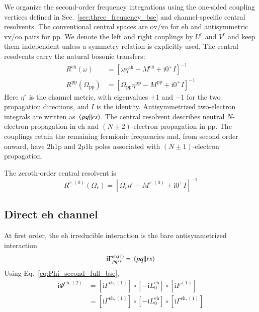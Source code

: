 \documentclass[aip,jcp,reprint,noshowkeys,superscriptaddress]{revtex4-1}
\newcommand{\ii}{\mathrm{i}}
\newcommand{\hhp}{\text{2h1p}}
\newcommand{\pph}{\text{2p1h}}
\newcommand{\eh}{\text{eh}}
\newcommand{\pp}{\text{pp}}
\begin{document}
We organize the second-order frequency integrations using the one-sided
coupling vertices defined in Sec.~\ref{sec:three_frequency_bse} and
channel-specific central resolvents.
The conventional central spaces are $\text{ov}/\text{vo}$ for $\eh$
and antisymmetric $\text{vv}/\text{oo}$ pairs for $\pp$.
We denote the left and right couplings by $U^r$ and $V^r$ and keep them
independent unless a symmetry relation is explicitly used.
The central resolvents carry the natural bosonic transfers:
\begin{align}
    R^\eh(\omega)&=[\omega\eta^\eh-M^\eh+\ii0^+I]^{-1}
    \label{eq:target_R_eh}
    \\
    R^\pp(\Omega_\pp)&=[\Omega_\pp\eta^\pp-M^\pp+\ii0^+I]^{-1}
    \label{eq:target_R_pp}
\end{align}
Here $\eta^r$ is the channel metric, with eigenvalues $+1$ and $-1$
for the two propagation directions, and $I$ is the identity.
Antisymmetrized two-electron integrals are written as $\mel{pq}{}{rs}$.
The central resolvent describes neutral $N$-electron propagation in
$\eh$ and $(N\pm2)$-electron propagation in $\pp$.
The couplings retain the remaining fermionic frequencies and, from
second order onward, have $\hhp$ and $\pph$ poles associated with
$(N\pm1)$-electron propagation.


The zeroth-order central resolvent is
\begin{equation}
    R^{r,(0)}(\Omega_r)
    =[\Omega_r\eta^r-M^{r,(0)}+\ii0^+I]^{-1}
    \label{eq:target_R_zero}
\end{equation}

\subsection{Direct eh channel}

At first order, the $\eh$ irreducible interaction is the bare
antisymmetrized interaction
\begin{equation}
	\ii\Gamma^{\eh,(1)}_{pqrs}
	=
	\mel{pq}{}{rs}
	\label{eq:Gamma_eh_first}
\end{equation}
Using Eq.~\eqref{eq:Phi_second_full_bse},
\begin{equation}
	\begin{aligned}
	\ii\Phi^{\eh,(2)}
	&=
	\left[\ii\Gamma^{\eh,(1)}\right]
	\circ\left[-\ii L_0^\eh\right]
	\circ\left[\ii F^{(1)}\right]
	\\
	&=
	\left[\ii\Gamma^{\eh,(1)}\right]
	\circ\left[-\ii L_0^\eh\right]
	\circ\left[\ii\Gamma^{\eh,(1)}\right]
	\end{aligned}
	\label{eq:Phi_eh_second_convolution}
\end{equation}
\end{document}
